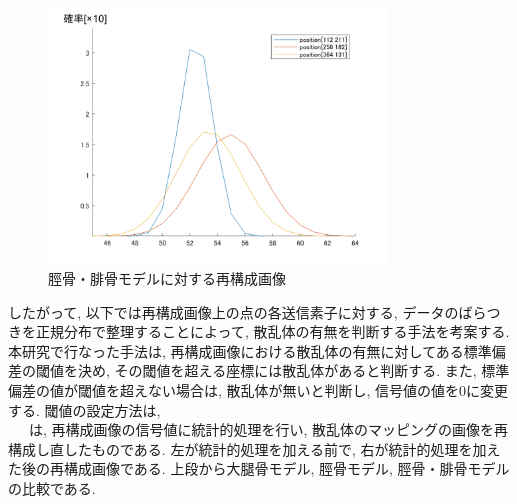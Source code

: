 \begin{figure}[H]
  \begin{center}
    \includegraphics[width=90mm]{fig/kaiseki3data.pdf}
  \end{center}
  \caption{脛骨・腓骨モデルに対する再構成画像}
\end{figure}
したがって, 以下では再構成画像上の点の各送信素子に対する, データのばらつきを正規分布で整理することによって, 散乱体の有無を判断する手法を考案する. 本研究で行なった手法は, 再構成画像における散乱体の有無に対してある標準偏差の閾値を決め, その閾値を超える座標には散乱体があると判断する. また, 標準偏差の値が閾値を超えない場合は, 散乱体が無いと判断し, 信号値の値を0に変更する. 閾値の設定方法は, \\
\ \ \ は, 再構成画像の信号値に統計的処理を行い, 散乱体のマッピングの画像を再構成し直したものである. 左が統計的処理を加える前で, 右が統計的処理を加えた後の再構成画像である. 上段から大腿骨モデル, 脛骨モデル, 脛骨・腓骨モデルの比較である. 
